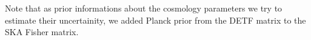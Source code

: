 \documentclass[useAMS,usenatbib]{mn2e}
\begin{document}
 Note that  as prior informations about the cosmology parameters we try to estimate their uncertainity, we added Planck prior from the DETF matrix  to the SKA Fisher matrix.
\end{document}

